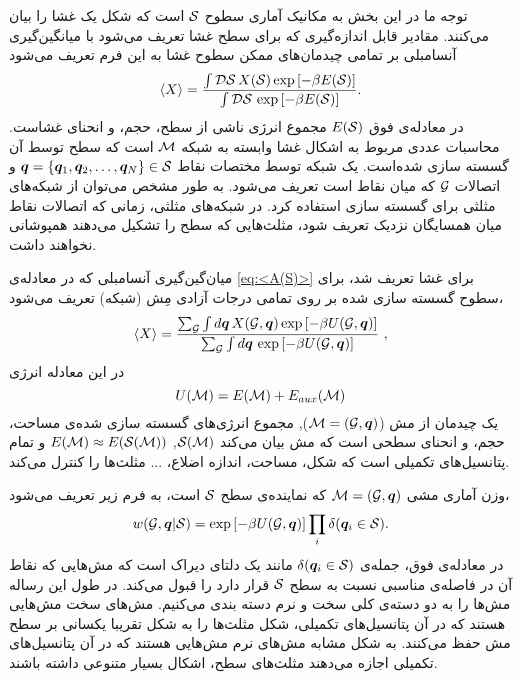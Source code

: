 توجه ما در این بخش به مکانیک آماری سطوح 
$\cal S$
است که شکل یک غشا را بیان می‌کنند. مقادیر قابل اندازه‌گیری که برای سطح غشا تعریف می‌شود با میانگین‌گیری آنسامبلی بر تمامی چیدمان‌های ممکن سطوح غشا به این فرم تعریف می‌شود
\begin{equation}\label{eq:<A(S)>}
\langle X \rangle = \frac{ \int {\cal D}{\cal S}\, X({\cal S}) \exp\left[-\beta E({\cal S})\right] } 
                                     { \int {\cal D}{\cal S}\,                  \exp\left[-\beta E({\cal S})\right] }.
\end{equation}
در معادله‌ی فوق 
$E({\cal S})$
مجموع انرژی ناشی از سطح، حجم، و انحنای غشاست. محاسبات عددی مربوط به اشکال غشا وابسته به شبکه
$\cal M$
است که سطح توسط آن گسسته سازی شده‌است. یک شبکه توسط مختصات نقاط
$\bm q=\{\bm q_1,\bm q_2, \ldots, \bm q_N \} \in \cal S$
و اتصالات
$\cal G$
که میان نقاط است تعریف می‌شود. به طور مشخص می‌توان از شبکه‌های‌ مثلثی برای گسسته سازی استفاده کرد. در شبکه‌های مثلثی، زمانی که اتصالات نقاط میان همسایگان نزدیک تعریف شود، مثلث‌هایی که سطح را تشکیل می‌دهند همپوشانی نخواهند داشت.

میان‌گین‌گیری آنسامبلی که در معادله‌ی 
\ref{eq:<A(S)>}
برای غشا تعریف شد، برای سطوح گسسته سازی شده بر روی تمامی درجات آزادی مِش (شبکه) تعریف می‌شود،
\begin{equation}\label{eq:<A(M)>}
\langle X \rangle = \frac{ \sum_{\cal G}\int d {\bm q}\, X({\cal G}, {\bm q}) \exp\left[-\beta U({\cal G}, {\bm q})\right] } 
                                     { \sum_{\cal G}\int d {\bm q}\,                                \exp\left[-\beta U({\cal G}, {\bm q})\right] }\ ,
\end{equation}
در این معادله انرژی
\begin{equation}
U({\cal M}) = E({\cal M}) + E_{aux}({\cal M})
\end{equation}
یک چیدمان از مش
 (${\cal M} = ({\cal G},\bm q)$),
مجموع انرژی‌های گسسته سازی شده‌ی مساحت، حجم، و انحنای سطحی است که مش بیان می‌کند
$\cal S(\cal M)$,  $E({\cal M}) \approx E(\cal S(\cal M))$
و تمام پتانسیل‌های تکمیلی است که شکل، مساحت، اندازه اضلاع، ... مثلث‌ها را کنترل می‌کند.

وزن آماری مشی
${\cal M} = ({\cal G},\bm q)$
که نماینده‌ی سطح
 $\cal S$
است، به فرم زیر تعریف می‌شود،
\begin{equation}\label{eq:w(M) for given S}
w({\cal G}, {\bm q}|{\cal S}) = \exp\left[-\beta U({\cal G}, {\bm q})\right] \prod_i \delta({\bm q}_i\in {\cal S}).
\end{equation}
 در معادله‌ی فوق، جمله‌ی
 $\delta({\bm q}_i\in {\cal S})$
مانند یک دلتای دیراک است که مش‌هایی که نقاط آن در فاصله‌ی مناسبی نسبت به سطح 
 $\cal S$
قرار دارد را قبول می‌کند. در طول این رساله مش‌ها را به دو دسته‌ی کلی سخت و نرم دسته بندی می‌کنیم. مش‌های سخت مش‌هایی هستند که در آن پتانسیل‌های تکمیلی، شکل مثلث‌ها را به شکل تقریبا یکسانی بر سطح مش حفظ می‌کنند. به شکل مشابه مش‌های نرم مش‌هایی هستند که در آن پتانسیل‌های تکمیلی اجازه‌ می‌دهند مثلث‌های سطح، اشکال بسیار متنوعی داشته باشند. 

